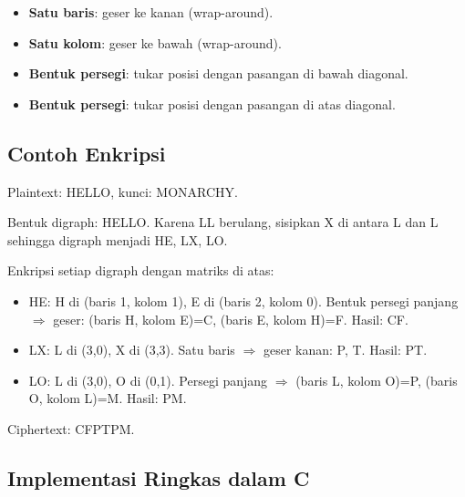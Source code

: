 \begin{itemize}
  \item \textbf{Satu baris}: geser ke kanan (wrap-around).
  \item \textbf{Satu kolom}: geser ke bawah (wrap-around).
  \item \textbf{Bentuk persegi}: tukar posisi dengan pasangan di bawah diagonal.
  \item \textbf{Bentuk persegi}: tukar posisi dengan pasangan di atas diagonal.
\end{itemize}


\subsection{Contoh Enkripsi}

Plaintext: HELLO, kunci: MONARCHY.

Bentuk digraph: HELLO. Karena LL berulang, sisipkan X di antara L dan L sehingga digraph menjadi HE, LX, LO.

Enkripsi setiap digraph dengan matriks di atas:
\begin{itemize}
  \item HE: H di (baris 1, kolom 1), E di (baris 2, kolom 0). Bentuk persegi panjang $\Rightarrow$ geser: (baris H, kolom E)=C, (baris E, kolom H)=F. Hasil: CF.
  \item LX: L di (3,0), X di (3,3). Satu baris $\Rightarrow$ geser kanan: P, T. Hasil: PT.
  \item LO: L di (3,0), O di (0,1). Persegi panjang $\Rightarrow$ (baris L, kolom O)=P, (baris O, kolom L)=M. Hasil: PM.
\end{itemize}

Ciphertext: CFPTPM.


\subsection{Implementasi Ringkas dalam C}

